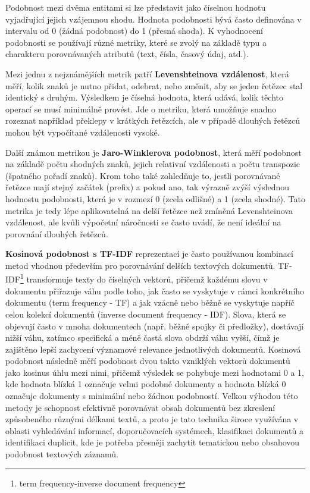 Podobnost mezi dvěma entitami si lze představit jako číselnou hodnotu vyjadřující jejich vzájemnou shodu. Hodnota podobnosti bývá často definována v intervalu od 0 (žádná podobnost) do 1 (přesná shoda). K vyhodnocení podobnosti se používají různé metriky, které se zvolý na základě typu a charakteru porovnávaných atributů (text, čísla, časový údaj, atd.).

Mezi jednu z nejznámějších metrik patří \textbf{Levenshteinova vzdálenost}, která měří, kolik znaků je nutno přidat, odebrat, nebo změnit, aby se jeden řetězec stal identický s druhým. Výsledkem je číselná hodnota, která udává, kolik těchto operací se musí minimálně provést. Jde o metriku, která umožňuje snadno rozeznat například překlepy v krátkých řetězcích, ale v případě dlouhých řetězců mohou být vypočítané vzdálenosti vysoké.


Další známou metrikou je \textbf{Jaro-Winklerova podobnost}, která měří podobnost na základě počtu shodných znaků, jejich relativní vzdálenosti a počtu transpozic (špatného pořadí znaků). Krom toho také zohledňuje to, jestli porovnávané řetězce mají stejný začátek (prefix) a pokud ano, tak výrazně zvýší výslednou hodnostu podobnosti, která je v rozmezí 0 (zcela odlišné) a 1 (zcela shodné). Tato metrika je tedy lépe aplikovatelná na delší řetězce než zmíněná Levenshteinova vzdálenost, ale kvůli výpočetní náročnosti se často uvádí, že není ideální na porovnání dlouhých řetězců.

\textbf{Kosinová podobnost s TF-IDF} reprezentací je často používanou kombinací metod vhodnou především pro porovnávání delších textových dokumentů. TF-IDF\footnote{term frequency-inverse document frequency} transformuje texty do číselných vektorů, přičemž každému slovu v dokumentu přiřazuje váhu podle toho, jak často se vyskytuje v rámci konkrétního dokumentu (term frequency - TF) a jak vzácně nebo běžně se vyskytuje napříč celou kolekcí dokumentů (inverse document frequency - IDF). Slova, která se objevují často v mnoha dokumentech (např. běžné spojky či předložky), dostávají nižší váhu, zatímco specifická a méně častá slova obdrží váhu vyšší, čímž je zajištěno lepší zachycení významové relevance jednotlivých dokumentů. Kosinová podobnost následně měří podobnost dvou takto vzniklých vektorů dokumentů jako kosinus úhlu mezi nimi, přičemž výsledek se pohybuje mezi hodnotami 0 a 1, kde hodnota blízká 1 označuje velmi podobné dokumenty a hodnota blízká 0 označuje dokumenty s minimální nebo žádnou podobností. Velkou výhodou této metody je schopnost efektivně porovnávat obsah dokumentů bez zkreslení způsobeného různými délkami textů, a proto je tato technika široce využívána v oblasti vyhledávání informací, doporučovacích systémech, klasifikaci dokumentů a identifikaci duplicit, kde je potřeba přesněji zachytit tematickou nebo obsahovou podobnost textových záznamů.

